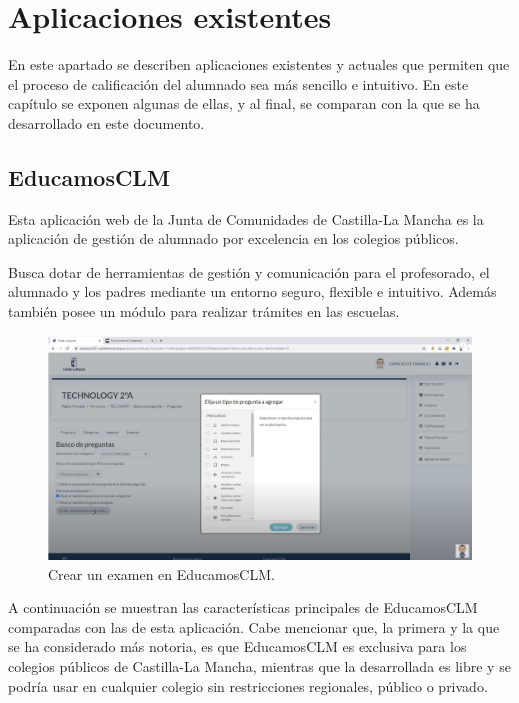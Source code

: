 \chapter{Aplicaciones existentes}
\label{cap:aplicacionesexistentes}

En este apartado se describen aplicaciones existentes y actuales que permiten que el proceso de calificación del alumnado sea más sencillo e intuitivo. En este capítulo se exponen algunas de ellas, y al final, se comparan con la que se ha desarrollado en este documento.

\section{EducamosCLM}

Esta aplicación web de la Junta de Comunidades de Castilla-La Mancha\cite{educamosclm} es la aplicación de gestión de alumnado por excelencia en los colegios públicos. 

Busca dotar de herramientas de gestión y comunicación para el profesorado, el alumnado y los padres mediante un entorno seguro, flexible e intuitivo. Además también posee un módulo para realizar trámites en las escuelas.

\begin{figure}[h]
\centering\includegraphics[width=1\linewidth]{figs/educamosCLM2.png}
\caption{Crear un examen en EducamosCLM.\cite{educamosclmyoutube}}
\label{Fig:educamosCLM}
\end{figure}

A continuación se muestran las características principales de EducamosCLM comparadas con las de esta aplicación. Cabe mencionar que, la primera y la que se ha considerado más notoria, es que EducamosCLM es exclusiva para los colegios públicos de Castilla-La Mancha, mientras que la desarrollada es libre y se podría usar en cualquier colegio sin restricciones regionales, público o privado.

